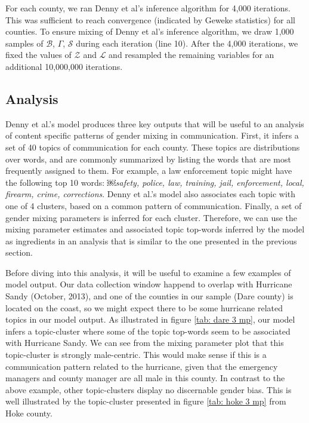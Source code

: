 \documentclass{pnastwo}
\begin{document}
\begin{article}
For each county, we ran Denny et al's inference algorithm for 4,000
iterations. This was sufficient to reach convergence (indicated by
Geweke statistics) for all counties. To ensure mixing of Denny et al's
inference algorithm, we draw 1,000 samples of $\mathcal{B}$, $\Gamma$,
$\mathcal{S}$ during each iteration (line 10). After the 4,000
iterations, we fixed the values of $\mathcal{Z}$ and $\mathcal{L}$ and
resampled the remaining variables for an additional 10,000,000
iterations.



\subsection{Analysis}
Denny et al.'s model produces three key outputs that will be useful to an analysis of content specific patterns of gender mixing in communication. First, it infers a set of 40 topics of communication for each county. These topics are distributions over words, and are commonly summarized by listing the words that are most frequently assigned to them. For example, a law enforcement topic might have the following top 10 words:
￼\emph{safety, police, law, training, jail, enforcement, local, firearm, crime, corrections}. Denny et al.'s model also associates each topic with one of 4 clusters, based on a common pattern of communication. Finally, a set of gender mixing parameters is inferred for each cluster. Therefore, we can use the mixing parameter estimates and associated topic top-words inferred by the model as ingredients in an analysis that is similar to the one presented in the previous section.

Before diving into this analysis, it will be useful to examine a few examples of model output. Our data collection window happend to overlap with Hurricane Sandy (October, 2013), and one of the counties in our sample (Dare county) is located on the coast, so we might expect there to be some hurricane related topics in our model output. As illustrated in figure \ref{tab: dare 3 mp}, our model infers a topic-cluster where some of the topic top-words seem to be associated with Hurricane Sandy. We can see from the mixing parameter plot that this topic-cluster is strongly male-centric. This would make sense if this is a communication pattern related to the hurricane, given that the emergency managers and county manager are all male in this county. In contrast to the above example, other topic-clusters display no discernable gender bias. This is well illustrated by the topic-cluster presented in figure \ref{tab: hoke 3 mp} from Hoke county.


\end{article}
\end{document}
